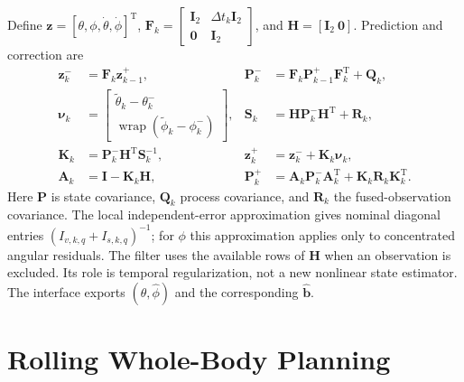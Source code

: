 \documentclass[journal,twoside]{IEEEtran}
\newcommand{\wrap}{\operatorname{wrap}}
\begin{document}
Define $\mathbf z=[\theta,\phi,\dot\theta,\dot\phi]^{\mathrm T}$, $\mathbf F_k=\left[\begin{smallmatrix}\mathbf I_2&\Delta t_k\mathbf I_2\\\mathbf0&\mathbf I_2\end{smallmatrix}\right]$, and $\mathbf H=[\mathbf I_2\ \mathbf0]$. Prediction and correction are
\begin{equation}
\begin{aligned}
\mathbf z_k^-&=\mathbf F_k\mathbf z_{k-1}^+,&
\mathbf P_k^-&=\mathbf F_k\mathbf P_{k-1}^+\mathbf F_k^{\mathrm T}+\mathbf Q_k,\\
\boldsymbol\nu_k&=\begin{bmatrix}\tilde\theta_k-\theta_k^-\\\wrap(\tilde\phi_k-\phi_k^-)\end{bmatrix},&
\mathbf S_k&=\mathbf H\mathbf P_k^-\mathbf H^{\mathrm T}+\mathbf R_k,\\
\mathbf K_k&=\mathbf P_k^-\mathbf H^{\mathrm T}\mathbf S_k^{-1},&
\mathbf z_k^+&=\mathbf z_k^-+\mathbf K_k\boldsymbol\nu_k,\\
\mathbf A_k&=\mathbf I-\mathbf K_k\mathbf H,&
\mathbf P_k^+&=\mathbf A_k\mathbf P_k^-\mathbf A_k^{\mathrm T}
+\mathbf K_k\mathbf R_k\mathbf K_k^{\mathrm T}.
\end{aligned}
\label{eq:kalman}
\end{equation}
Here $\mathbf P$ is state covariance, $\mathbf Q_k$ process covariance, and $\mathbf R_k$ the fused-observation covariance. The local independent-error approximation gives nominal diagonal entries $(I_{v,k,q}+I_{s,k,q})^{-1}$; for $\phi$ this approximation applies only to concentrated angular residuals. The filter uses the available rows of $\mathbf H$ when an observation is excluded. Its role is temporal regularization, not a new nonlinear state estimator. The interface exports $(\hat\theta,\hat\phi)$ and the corresponding $\hat{\mathbf b}$.

\section{Rolling Whole-Body Planning}\label{sec:planning}
\end{document}
